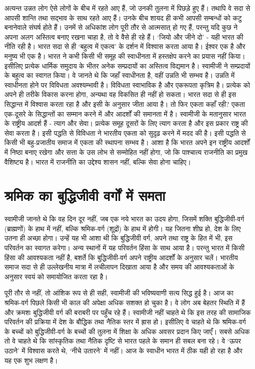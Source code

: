 अत्यन्त उन्नत लोग ऐसे लोगों के बीच में रहते आए हैं, जो उनकी तुलना में पिछड़े हुए हैं। तथापि वे सदा से आपसी शान्ति तथा सद्भाव के साथ रहते आए हैं। उनके बीच शायद ही कभी आपसी सम्बन्धों को कटु बनानेवाले संघर्ष होते हैं। उनमें से अधिकांश लोग पूरी तौर से आत्मसात् हो गए हैं, परन्तु यदि कुछ ने अपना अलग अस्तित्व बनाए रखना चाहा है, तो वे वैसे ही रहे हैं। ‘जियो और जीने दो’ - यही भारत की नीति रही है। भारत सदा से ही ‘बहुत्व में एकत्व’ के दर्शन में विश्वास करता आया है। ईश्वर एक है और मनुष्य भी एक है। भारत ने कभी किसी भी समूह की स्वाधीनता में हस्तक्षेप करने का प्रयास नहीं किया। इसीलिए प्रत्येक धार्मिक समुदाय के भीतर अनेक सम्प्रदायों का अस्तित्व विद्यमान है। स्वामीजी ने सम्प्रदायों के बहुत्व का स्वागत किया। वे जानते थे कि जहाँ स्वाधीनता है, वहीं उन्नति भी सम्भव है। उन्नति में स्वाधीनता होने पर विविधता अवश्यम्भावी है। विविधता स्वाभाविक है और एकरूपता कृत्रिम है। प्रत्येक को अपने ही तरीके विकास करना होगा, अन्यथा वह विकसित ही नहीं हो सकता। भारत सदा से ही इस सिद्धान्त में विश्वास करता रहा है और इसी के अनुसार जीता आया है। तो फिर एकता कहाँ रही? एकता एक-दूसरे के सिद्धान्तों का सम्मान करने में और आदर्शों की समानता में है। स्वामीजी के मतानुसार भारत के राष्ट्रीय आदर्श हैं - त्याग और सेवा। प्रत्येक समूह दूसरों के लिए त्याग करता है और इस प्रकार राष्ट्र की सेवा करता है। इसी पद्धति से विविधता ने भारतीय एकता को सुदृढ़ करने में मदद की है। इसी पद्धति से किसी भी बहु-प्रजातीय समाज में एकता की स्थापना सम्भव है। आशा है कि भारत अपने इन राष्ट्रीय आदर्शों में निष्ठा बनाए रखेगा और सत्ता के उस लोभ से सम्मोहित नहीं होगा, जो कि पाश्चात्य राजनीति का प्रमुख वैशिष्ट्य है। भारत में राजनीति का उद्देश्य शासन नहीं, बल्कि सेवा होना चाहिए।


\section*{श्रमिक का बुद्धिजीवी वर्गों में समता}

स्वामीजी जानते थे कि वह दिन दूर नहीं, जब एक नये भारत का उदय होगा, जिसमें शक्ति बुद्धिजीवी-वर्ग (ब्राह्मणों) के हाथ में नहीं, बल्कि श्रमिक-वर्ग (शूद्रों) के हाथ में होगी। यह जितना शीघ्र हो, देश के लिए उतना ही अच्छा होगा। उन्हें यह भी आशा थी कि बुद्धिजीवी वर्ग, अपने तथा राष्ट्र के हित में भी, इस परिवर्तन का स्वागत करेगा। अन्य स्थानों में यह परिवर्तन हिंसा के साथ आया है। परन्तु भारत में किसी हिंसा की आवश्यकता नहीं है, बशर्ते कि बुद्धिजीवी-वर्ग अपने राष्ट्रीय आदर्शों के अनुसार चलें। भारतीय समाज सदा से ही उल्लेखनीय मात्रा में लचीलापन दिखाता आया है और समय की आवश्यकताओं के अनुसार स्वयं को समायोजित करता रहा है। 

पूरी तौर से नहीं, तो आंशिक रूप से ही सही, स्वामीजी की भविष्यवाणी सत्य सिद्ध हुई है। आज का श्रमिक-वर्ग पिछले किसी भी काल की अपेक्षा अधिक सशक्त हो चुका है। वे लोग अब बेहतर स्थिति में हैं और क्रमशः बुद्धिजीवी वर्ग की बराबरी पर पहुँच रहे हैं। स्वामीजी नहीं चाहते थे कि इस तरह की सामाजिक परिवर्तन की प्रक्रिया में देश के बौद्धिक तथा नैतिक स्तर में ह्रास हो। इसीलिए वे चाहते थे कि श्रमिक-वर्ग के बच्चों को बुद्धिजीवी-वर्ग के बच्चों की तुलना में शिक्षा के अधिक अवसर प्रदान किए जाएँ। सबसे अधिक तो वे चाहते थे कि सांस्कृतिक तथा नैतिक दृष्टि से भारत पहले के समान ही सबल बना रहे। वे ‘ऊपर उठाने’ में विश्वास करते थे, ‘नीचे उतारने’ में नहीं। आज के स्वाधीन भारत में ठीक यही हो रहा है और यह एक शुभ लक्षण है।


